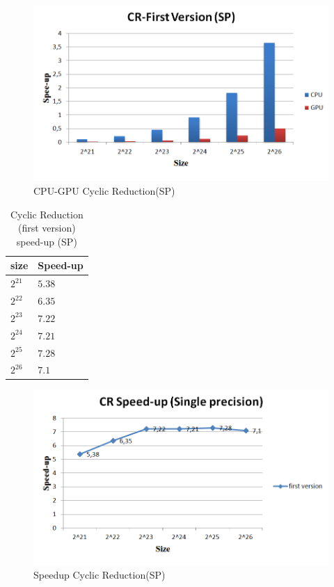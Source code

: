 \begin{figure}[H]
   \centering
       \includegraphics[width=1\textwidth]{grafhmata/cr_first_sp.png}
   \caption{CPU-GPU Cyclic Reduction(SP)}
   \label{fig:CPU-GPU Cyclic Reduction(SP)}
\end{figure}

\begin{table}[H]
\caption{Cyclic Reduction (first version) speed-up (SP)} 
\centering 
\begin{tabular}{| l | p{3cm} |} 
\hline\hline 
size	 & Speed-up  \\  [0.8ex] 
\hline        
        $2^{21}$ & $5.38$      \\ 	
        $2^{22}$ & $6.35$     \\ 	
        $2^{23}$ & $7.22$      \\ 
        $2^{24}$ & $7.21$    \\ 
        $2^{25}$ & $7.28$     \\ 
        $2^{26}$ & $7.1$       \\ [1ex] 
        \hline
\end{tabular}
\label{table:cr_first_spup} 
\end{table}

\begin{figure}[H]
   \centering
       \includegraphics[width=1\textwidth]{grafhmata/cr_first_sp_speedup.png}
   \caption{Speedup Cyclic Reduction(SP)}
   \label{fig:Speedup Cyclic Reduction(SP)}
\end{figure}

